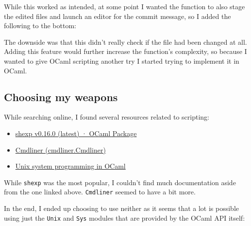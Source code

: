 \documentclass[11pt]{article}
\providecommand{\tightlist}{%
      \setlength{\itemsep}{0pt}\setlength{\parskip}{0pt}}
\newenvironment{Shaded}{}{}
\newcommand{\KeywordTok}[1]{\textcolor[rgb]{0.00,0.44,0.13}{\textbf{{#1}}}}
\newcommand{\StringTok}[1]{\textcolor[rgb]{0.25,0.44,0.63}{{#1}}}
\newcommand{\FunctionTok}[1]{\textcolor[rgb]{0.02,0.16,0.49}{{#1}}}
\newcommand{\NormalTok}[1]{{#1}}
\newcommand{\VariableTok}[1]{\textcolor[rgb]{0.10,0.09,0.49}{{#1}}}
\newcommand{\ControlFlowTok}[1]{\textcolor[rgb]{0.00,0.44,0.13}{\textbf{{#1}}}}
\newcommand{\OperatorTok}[1]{\textcolor[rgb]{0.40,0.40,0.40}{{#1}}}
\newcommand{\BuiltInTok}[1]{{#1}}
\newcommand{\AttributeTok}[1]{\textcolor[rgb]{0.49,0.56,0.16}{{#1}}}
\begin{document}
    While this worked as intended, at some point I wanted the function to
also stage the edited files and launch an editor for the commit message,
so I added the following to the bottom:

    \begin{Shaded}
\end{Shaded}

    The downside was that this didn't really check if the file had been
changed at all. Adding this feature would further increase the
function's complexity, so because I wanted to give OCaml scripting
another try I started trying to implement it in OCaml.

    \hypertarget{choosing-my-weapons}{%
\subsection{Choosing my weapons}\label{choosing-my-weapons}}

    While searching online, I found several resources related to scripting:

\begin{itemize}
\tightlist
\item
  \href{https://ocaml.org/p/shexp/latest/doc/Shexp_process/index.html}{shexp
  v0.16.0 (latest) · OCaml Package}
\item
  \href{https://erratique.ch/software/cmdliner/doc/Cmdliner/}{Cmdliner
  (cmdliner.Cmdliner)}
\item
  \href{http://ocaml.github.io/ocamlunix/}{Unix system programming in
  OCaml}
\end{itemize}

While \texttt{shexp} was the most popular, I couldn't find much
documentation aside from the one linked above. \texttt{Cmdliner} seemed
to have a bit more.

In the end, I ended up choosing to use neither as it seems that a lot is
possible using just the \texttt{Unix} and \texttt{Sys} modules that are
provided by the OCaml API itself:
\end{document}
